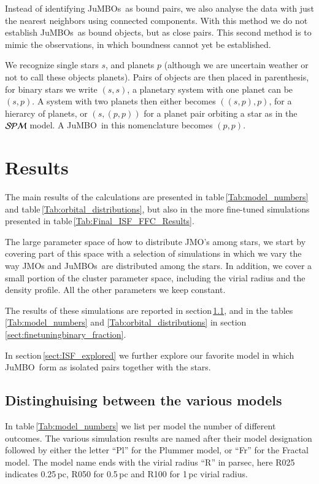 \documentclass[submission,phys]{lib/SciPost}
\newcommand{\jumbo}{\mbox{JuMBO}}
\newcommand{\jumbos}{\mbox{JuMBOs}}
\begin{document}
Instead of identifying \jumbos\, as bound pairs, we also analyse the
data with just the nearest neighbors using connected components. With
this method we do not establish \jumbos\, as bound objects, but as
close pairs. This second method is to mimic the observations, in which
boundness cannot yet be established.

We recognize single stars $s$, and planets $p$ (although we are
uncertain weather or not to call these objects planets). Pairs of
objects are then placed in parenthesis, for binary stars we write
$(s,s)$, a planetary system with one planet can be $(s,p)$.  A system
with two planets then either becomes $((s,p),p)$, for a hierarcy of
planets, or $(s,(p,p))$ for a planet pair orbiting a star as in the
${\cal SPM}$ model. A \jumbo\, in this nomenclature becomes $(p,p)$.

\section{Results}\label{Sect:Results}

The main results of the calculations are presented in
table\,\ref{Tab:model_numbers} and
table\,\ref{Tab:orbital_distributions}, but also in the more
fine-tuned simulations presented in table\,\ref{Tab:Final_ISF_FFC_Results}.

The large parameter space of how to distribute JMO's among stars, we
start by covering part of this space with a selection of simulations
in which we vary the way JMOs and \jumbos\, are distributed among the
stars. In addition, we cover a small portion of the cluster parameter
space, including the virial radius and the density profile. All the
other parameters we keep constant.

The results of these simulations are reported in
section\,\ref{sect:model_selection}, and in the
tables\,\ref{Tab:model_numbers} and \ref{Tab:orbital_distributions} in
section\,\ref{sect:finetuningbinary_fraction}.

In section\,\ref{sect:ISF_explored} we further explore our favorite
model in which \jumbo\, form as isolated pairs together with the
stars.

\subsection{Distinghuising between the various models}\label{sect:model_selection}


In table\,\ref{Tab:model_numbers} we list per model the number of
different outcomes.  The various simulation results are named after
their model designation followed by either the letter ``Pl'' for the
Plummer model, or ``Fr'' for the Fractal model.  The model name ends
with the virial radius ``R'' in parsec, here R025 indicates 0.25\,pc,
R050 for 0.5\,pc and R100 for 1\,pc virial radius.
\end{document}
